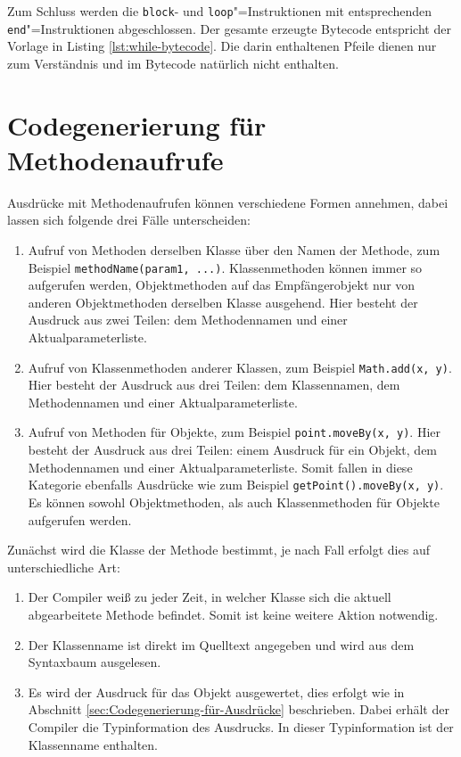Zum Schluss werden die \lstinline{block}- und \lstinline{loop}"=Instruktionen mit entsprechenden \lstinline{end}"=Instruktionen abgeschlossen. Der gesamte erzeugte Bytecode entspricht der Vorlage in Listing \ref{lst:while-bytecode}. Die darin enthaltenen Pfeile dienen nur zum Verständnis und im Bytecode natürlich nicht enthalten.



\pagebreak
\section{Codegenerierung für Methodenaufrufe}
\label{sec:Codegenerierung-für-Methodenaufrufe}

Ausdrücke mit Methodenaufrufen können verschiedene Formen annehmen, dabei lassen sich folgende drei Fälle unterscheiden:
\begin{enumerate}
    \item Aufruf von Methoden derselben Klasse über den Namen der Methode, zum Beispiel \lstinline{methodName(param1, ...)}. Klassenmethoden können immer so aufgerufen werden, Objektmethoden auf das Empfängerobjekt nur von anderen Objektmethoden derselben Klasse ausgehend. Hier besteht der Ausdruck aus zwei Teilen: dem Methodennamen und einer Aktualparameterliste.
    \item Aufruf von Klassenmethoden anderer Klassen, zum Beispiel \lstinline{Math.add(x, y)}. Hier besteht der Ausdruck aus drei Teilen: dem Klassennamen, dem Methodennamen und einer Aktualparameterliste.
    \item Aufruf von Methoden für Objekte, zum Beispiel \lstinline{point.moveBy(x, y)}. Hier besteht der Ausdruck aus drei Teilen: einem Ausdruck für ein Objekt, dem Methodennamen und einer Aktualparameterliste. Somit fallen in diese Kategorie ebenfalls Ausdrücke wie zum Beispiel \lstinline{getPoint().moveBy(x, y)}. Es können sowohl Objektmethoden, als auch Klassenmethoden für Objekte aufgerufen werden.
\end{enumerate}

Zunächst wird die Klasse der Methode bestimmt, je nach Fall erfolgt dies auf unterschiedliche Art:
\begin{enumerate}
    \item Der Compiler weiß zu jeder Zeit, in welcher Klasse sich die aktuell abgearbeitete Methode befindet. Somit ist keine weitere Aktion notwendig.
    \item Der Klassenname ist direkt im Quelltext angegeben und wird aus dem Syntaxbaum ausgelesen.
    \item Es wird der Ausdruck für das Objekt ausgewertet, dies erfolgt wie in Abschnitt \ref{sec:Codegenerierung-für-Ausdrücke} beschrieben. Dabei erhält der Compiler die Typinformation des Ausdrucks. In dieser Typinformation ist der Klassenname enthalten.
\end{enumerate}

